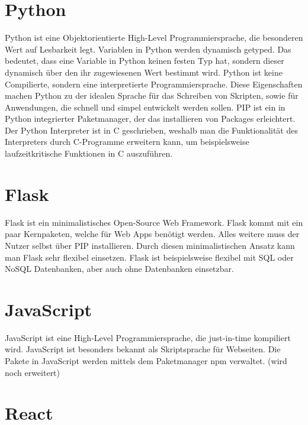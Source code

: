 \section{Python}
\label{sec:python}

Python ist eine Objektorientierte High-Level Programmiersprache, die besonderen Wert auf Lesbarkeit legt.
Variablen in Python werden dynamisch getyped.
Das bedeutet, dass eine Variable in Python keinen festen Typ hat, sondern dieser dynamisch über den ihr zugewiesenen Wert bestimmt wird.
Python ist keine Compilierte, sondern eine interpretierte Programmiersprache.
Diese Eigenschaften machen Python zu der idealen Sprache für das Schreiben von Skripten, sowie für Anwendungen, die schnell und simpel entwickelt werden sollen.
PIP ist ein in Python integrierter Paketmanager, der das installieren von Packages erleichtert.
Der Python Interpreter ist in C geschrieben, weshalb man die Funktionalität des Interpreters durch C-Programme erweitern kann, um beispielsweise laufzeitkritische Funktionen in C auszuführen.
~\autocite{van:python}

\section{Flask}
\label{sec:flask}

Flask ist ein minimalistisches Open-Source Web Framework.
Flask kommt mit ein paar Kernpaketen, welche für Web Apps benötigt werden.
Alles weitere muss der Nutzer selbst über PIP installieren.
Durch diesen minimalistischen Ansatz kann man Flask sehr flexibel einsetzen.
Flask ist beispielsweise flexibel mit SQL oder NoSQL Datenbanken, aber auch ohne Datenbanken einsetzbar.
~\autocite{grindberg:flask}


\section{JavaScript}
\label{sec:js}

JavaScript ist eine High-Level Programmiersprache, die just-in-time kompiliert wird.
JavaScript ist besonders bekannt als Skriptsprache für Webseiten.
Die Pakete in JavaScript werden mittels dem Paketmanager npm verwaltet.
(wird noch erweitert)

\section{React}
\label{sec:react}

